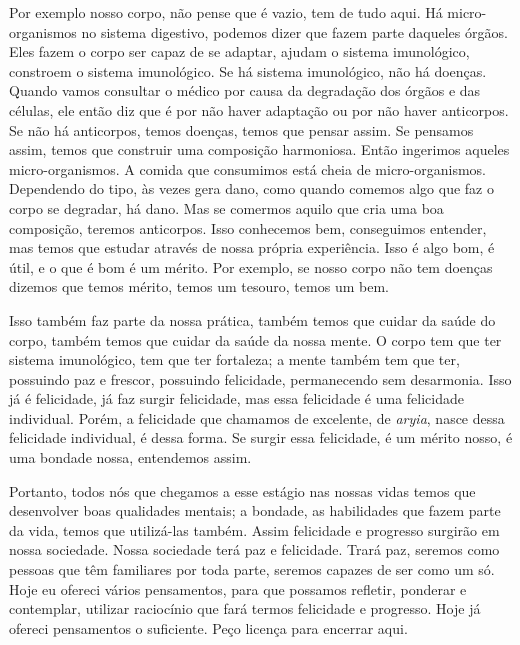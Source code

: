 Por exemplo nosso corpo, não pense que é vazio, tem de tudo aqui. Há
micro-organismos no sistema digestivo, podemos dizer que fazem parte
daqueles órgãos. Eles fazem o corpo ser capaz de se adaptar, ajudam o
sistema imunológico, constroem o sistema imunológico. Se há sistema
imunológico, não há doenças. Quando vamos consultar o médico por causa
da degradação dos órgãos e das células, ele então diz que é por não
haver adaptação ou por não haver anticorpos. Se não há anticorpos,
temos doenças, temos que pensar assim. Se pensamos assim, temos que
construir uma composição harmoniosa. Então ingerimos aqueles
micro-organismos. A comida que consumimos está cheia de
micro-organismos. Dependendo do tipo, às vezes gera dano, como quando
comemos algo que faz o corpo se degradar, há dano. Mas se comermos
aquilo que cria uma boa composição, teremos anticorpos. Isso conhecemos
bem, conseguimos entender, mas temos que estudar através de nossa
própria experiência. Isso é algo bom, é útil, e o que é bom é um
mérito. Por exemplo, se nosso corpo não tem doenças dizemos que temos
mérito, temos um tesouro, temos um bem. 

Isso também faz parte da nossa prática, também temos que cuidar da
saúde do corpo, também temos que cuidar da saúde da nossa mente. O
corpo tem que ter sistema imunológico, tem que ter
fortaleza; a mente também tem que ter,
possuindo paz e frescor, possuindo felicidade, permanecendo sem
desarmonia. Isso já é felicidade, já faz surgir felicidade, mas essa
felicidade é uma felicidade individual. Porém, a felicidade que
chamamos de excelente, de \emph{aryia}, nasce dessa felicidade
individual, é dessa forma. Se surgir essa felicidade, é um mérito
nosso, é uma bondade nossa, entendemos assim. 

Portanto, todos nós que chegamos a esse estágio nas nossas vidas
temos que desenvolver boas qualidades
mentais; a bondade, as habilidades que fazem
parte da vida, temos que utilizá-las também. Assim felicidade e
progresso surgirão em nossa sociedade. Nossa
sociedade terá paz e felicidade. Trará paz, seremos como pessoas que
têm familiares por toda parte, seremos capazes de ser como um só. Hoje
eu ofereci vários pensamentos, para que possamos refletir, ponderar e
contemplar, utilizar raciocínio que fará termos felicidade e progresso.
Hoje já ofereci pensamentos o suficiente. Peço licença para encerrar
aqui.

